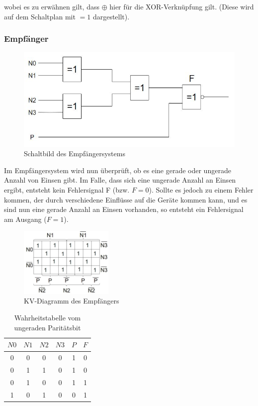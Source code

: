 \documentclass{article}
\begin{document}
\noindent
wobei es zu erwähnen gilt, dass $\oplus$ hier für die XOR-Verknüpfung gilt. (Diese wird auf dem Schaltplan mit $=1$ dargestellt).

\newpage
\subsubsection{Empfänger}
\begin{figure}[h]
  \centering
  \includegraphics[width=\textwidth]{../assets/images/DI1/ReceiverSchalt.png}
  \caption{Schaltbild des Empfängersystems}
  \label{fig:schalt2}
\end{figure}

Im Empfängersystem wird nun überprüft, ob es eine gerade oder ungerade Anzahl von Einsen gibt. Im Falle, dass sich eine ungerade Anzahl an Einsen ergibt, entsteht kein Fehlersignal F (bzw. $F = 0$). Sollte es jedoch zu einem Fehler kommen, der durch verschiedene Einflüsse auf die Geräte kommen kann, und es sind nun eine gerade Anzahl an Einsen vorhanden, so entsteht ein Fehlersignal am Ausgang ($F = 1$).

\begin{figure}[h]
  \centering
  \includegraphics[width=0.4\textwidth]{../assets/images/DI1/ReceiverKV.png}
  \caption{KV-Diagramm des Empfängers}
  \label{fig:kv2}
\end{figure}

\begin{table}[h]
\begin{center}
\begin{tabular}{c|c|c|c|c|c}
$N0$ & $N1$ & $N2$ & $N3$ & $P$ & $F$ \\
\hline
0 & 0 & 0 & 0 & 1 & 0\\
0 & 1 & 1 & 0 & 1 & 0\\
0 & 1 & 0 & 0 & 1 & 1\\
1 & 0 & 1 & 0 & 0 & 1\\
\end{tabular}
\caption{Wahrheitstabelle vom ungeraden Paritätsbit}
\end{center}
\end{table}
\end{document}
